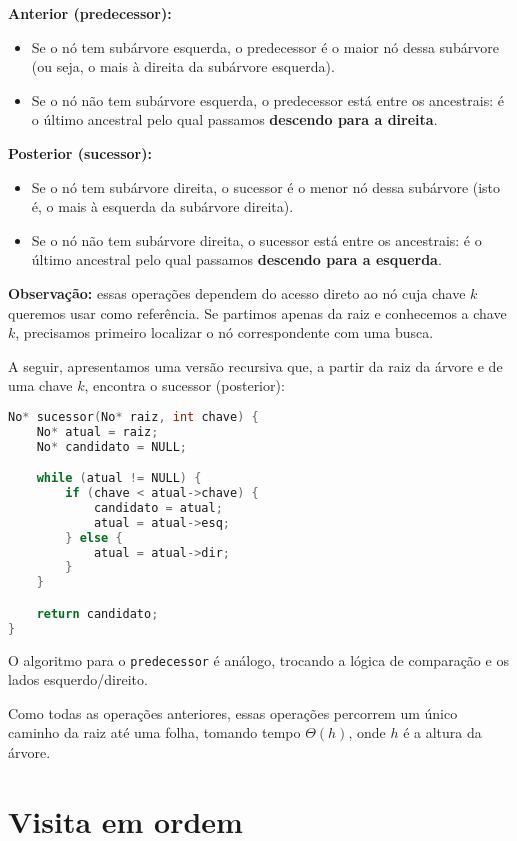 \textbf{Anterior (predecessor):}

\begin{itemize}
  \item Se o nó tem subárvore esquerda, o predecessor é o maior nó dessa subárvore (ou seja, o mais à direita da subárvore esquerda).
  \item Se o nó não tem subárvore esquerda, o predecessor está entre os ancestrais: é o último ancestral pelo qual passamos \textbf{descendo para a direita}.
\end{itemize}

\textbf{Posterior (sucessor):}

\begin{itemize}
  \item Se o nó tem subárvore direita, o sucessor é o menor nó dessa subárvore (isto é, o mais à esquerda da subárvore direita).
  \item Se o nó não tem subárvore direita, o sucessor está entre os ancestrais: é o último ancestral pelo qual passamos \textbf{descendo para a esquerda}.
\end{itemize}

\textbf{Observação:} essas operações dependem do acesso direto ao nó cuja chave $k$ queremos usar como referência. 
Se partimos apenas da raiz e conhecemos a chave $k$, precisamos primeiro localizar o nó correspondente com uma busca.

A seguir, apresentamos uma versão recursiva que, a partir da raiz da árvore e de uma chave $k$, encontra o sucessor (posterior):

\begin{lstlisting}[language=C, caption={Busca do sucessor em ABB}]
No* sucessor(No* raiz, int chave) {
    No* atual = raiz;
    No* candidato = NULL;

    while (atual != NULL) {
        if (chave < atual->chave) {
            candidato = atual;
            atual = atual->esq;
        } else {
            atual = atual->dir;
        }
    }

    return candidato;
}
\end{lstlisting}

O algoritmo para o \texttt{predecessor} é análogo, trocando a lógica de comparação e os lados esquerdo/direito.

Como todas as operações anteriores, essas operações percorrem um único caminho da raiz até uma folha, tomando tempo $\Theta(h)$, onde $h$ é a altura da árvore. 


\section{Visita em ordem}

